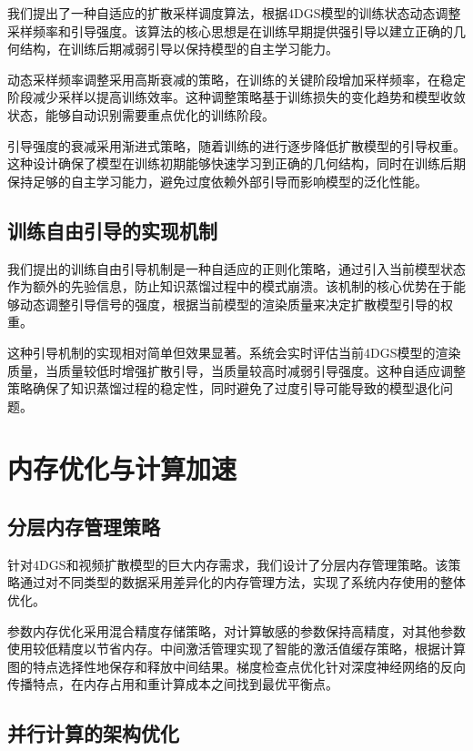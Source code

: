 我们提出了一种自适应的扩散采样调度算法，根据4DGS模型的训练状态动态调整采样频率和引导强度。该算法的核心思想是在训练早期提供强引导以建立正确的几何结构，在训练后期减弱引导以保持模型的自主学习能力。

动态采样频率调整采用高斯衰减的策略，在训练的关键阶段增加采样频率，在稳定阶段减少采样以提高训练效率。这种调整策略基于训练损失的变化趋势和模型收敛状态，能够自动识别需要重点优化的训练阶段。

引导强度的衰减采用渐进式策略，随着训练的进行逐步降低扩散模型的引导权重。这种设计确保了模型在训练初期能够快速学习到正确的几何结构，同时在训练后期保持足够的自主学习能力，避免过度依赖外部引导而影响模型的泛化性能。

\subsection{训练自由引导的实现机制}

我们提出的训练自由引导机制是一种自适应的正则化策略，通过引入当前模型状态作为额外的先验信息，防止知识蒸馏过程中的模式崩溃。该机制的核心优势在于能够动态调整引导信号的强度，根据当前模型的渲染质量来决定扩散模型引导的权重。

这种引导机制的实现相对简单但效果显著。系统会实时评估当前4DGS模型的渲染质量，当质量较低时增强扩散引导，当质量较高时减弱引导强度。这种自适应调整策略确保了知识蒸馏过程的稳定性，同时避免了过度引导可能导致的模型退化问题。

\section{内存优化与计算加速}

\subsection{分层内存管理策略}

针对4DGS和视频扩散模型的巨大内存需求，我们设计了分层内存管理策略。该策略通过对不同类型的数据采用差异化的内存管理方法，实现了系统内存使用的整体优化。

参数内存优化采用混合精度存储策略，对计算敏感的参数保持高精度，对其他参数使用较低精度以节省内存。中间激活管理实现了智能的激活值缓存策略，根据计算图的特点选择性地保存和释放中间结果。梯度检查点优化针对深度神经网络的反向传播特点，在内存占用和重计算成本之间找到最优平衡点。

\subsection{并行计算的架构优化}

